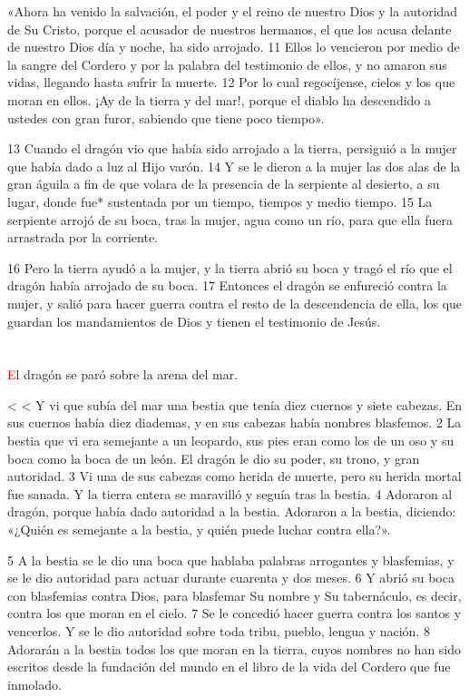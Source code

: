 \documentclass[12pt,twocolumn,twoside]{book}
\makeatletter
\def\zz{%
\ifnum\prevgraf<\c@L@lines
\zzc\z@
\loop
\ifnum\zzc<\prevgraf
\advance\zzc\@ne
\afterassignment\zzda\count@\L@parshape\relax
\repeat
\parshape\L@parshape
\fi}
\def\zzda{\afterassignment\zzdb\dimen@}
\def\zzdb{\afterassignment\zzdef\dimen@}
\def\zzdef#1\relax{\edef\L@parshape{\the\numexpr\count@-1\relax\space #1}}
\makeatother
\begin{document}
«Ahora ha venido la salvación, el poder y el reino de nuestro Dios y la autoridad de Su Cristo, porque el acusador de nuestros hermanos, el que los acusa delante de nuestro Dios día y noche, ha sido arrojado. 11 Ellos lo vencieron por medio de la sangre del Cordero y por la palabra del testimonio de ellos, y no amaron sus vidas, llegando hasta sufrir la muerte. 12 Por lo cual regocíjense, cielos y los que moran en ellos. ¡Ay de la tierra y del mar!, porque el diablo ha descendido a ustedes con gran furor, sabiendo que tiene poco tiempo».

13 Cuando el dragón vio que había sido arrojado a la tierra, persiguió a la mujer que había dado a luz al Hijo varón. 14 Y se le dieron a la mujer las dos alas de la gran águila a fin de que volara de la presencia de la serpiente al desierto, a su lugar, donde fue* sustentada por un tiempo, tiempos y medio tiempo. 15 La serpiente arrojó de su boca, tras la mujer, agua como un río, para que ella fuera arrastrada por la corriente.

16 Pero la tierra ayudó a la mujer, y la tierra abrió su boca y tragó el río que el dragón había arrojado de su boca. 17 Entonces el dragón se enfureció contra la mujer, y salió para hacer guerra contra el resto de la descendencia de ella, los que guardan los mandamientos de Dios y tienen el testimonio de Jesús.
\chapter{}
\lettrine[lines=4]{\textcolor{red}{E}}{}l dragón se paró sobre la arena del mar.

\zz Y vi que subía del mar una bestia que tenía diez cuernos y siete cabezas. En sus cuernos había diez diademas, y en sus cabezas había nombres blasfemos. 2 La bestia que vi era semejante a un leopardo, sus pies eran como los de un oso y su boca como la boca de un león. El dragón le dio su poder, su trono, y gran autoridad. 3 Vi una de sus cabezas como herida de muerte, pero su herida mortal fue sanada. Y la tierra entera se maravilló y seguía tras la bestia. 4 Adoraron al dragón, porque había dado autoridad a la bestia. Adoraron a la bestia, diciendo: «¿Quién es semejante a la bestia, y quién puede luchar contra ella?».

5 A la bestia se le dio una boca que hablaba palabras arrogantes y blasfemias, y se le dio autoridad para actuar durante cuarenta y dos meses. 6 Y abrió su boca con blasfemias contra Dios, para blasfemar Su nombre y Su tabernáculo, es decir, contra los que moran en el cielo. 7 Se le concedió hacer guerra contra los santos y vencerlos. Y se le dio autoridad sobre toda tribu, pueblo, lengua y nación. 8 Adorarán a la bestia todos los que moran en la tierra, cuyos nombres no han sido escritos desde la fundación del mundo en el libro de la vida del Cordero que fue inmolado.
\end{document}
